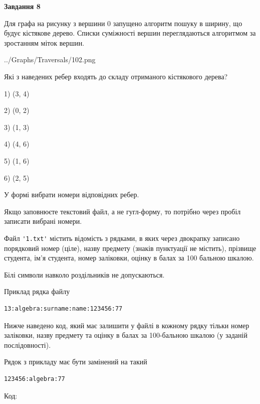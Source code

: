\documentclass[12pt, ukrainian]{article}
\def\code#1{\Verb!#1!}
\begin{document}
{\begin {large}
{\begin {center}\textbf{Завдання 8}\end {center}}\par
Для графа на рисунку з вершини 0 запущено алгоритм пошуку в ширину, що будує кістякове дерево. Списки суміжності вершин переглядаються алгоритмом за зростанням міток вершин.\par
\begin{center}
	{../Graphs/Traversals/102.png}
\end{center}
\par Які з наведених ребер входять до складу отриманого кістякового дерева?\par
1) (3, 4)\par
2) (0, 2)\par
3) (1, 3)\par
4) (4, 6)\par
5) (1, 6)\par
6) (2, 5)\par
{\vskip 15pt} У формі вибрати номери відповідних ребер.


Якщо заповнюєте текстовий файл, а не гугл-форму, то потрібно через пробіл записа\-ти вибрані номери.\par
\newpage


Файл \code{'1.txt'} містить відомість з рядками, в яких через двокрапку записа\-но поряд\-ковий номер (ціле), назву предмету (знаків пунктуації не містить), прізвище студента, ім'я студента, номер заліковки, оцінку в балах за 100 бальною шкалою.

Білі символи навколо роздільників не допускаються.

Приклад рядка файлу



\begin{verbatim}
13:algebra:surname:name:123456:77
\end{verbatim}


Нижче наведено код, який має залишити у файлі в кожному рядку тільки номер заліковки, назву предмету та оцінку в балах за 100-бальною шкалою (у заданій послі\-дов\-ності).

Рядок з прикладу має бути замінений на такий



\begin{verbatim}
123456:algebra:77
\end{verbatim}




Код:




\end{large}}
\end{document}
